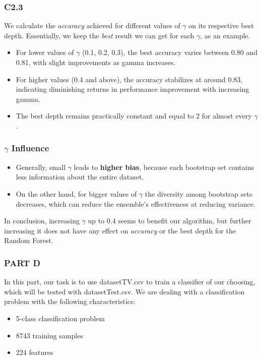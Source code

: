 \documentclass{beamer}
\begin{document}
\begin{frame}
\frametitle{C2.3}

We calculate the \textit{accuracy} achieved for different values of $\gamma$ on its respective best depth. Essentially, we keep the \textit{best} result we can get for each $\gamma$, as an example. 

\begin{itemize}
    \item For lower values of $\gamma$ (0.1, 0.2, 0.3), the best accuracy varies between 0.80 and 0.81, with slight improvements as gamma increases. 
    \item For higher values (0.4 and above), the accuracy stabilizes at around 0.83, indicating diminishing returns in performance improvement with increasing gamma. 
    \item The best depth remains practically constant and equal to 2 for almost every $\gamma$.
\end{itemize}

\end{frame}

\begin{frame}
\frametitle{$\gamma$ Influence}
\begin{itemize}
    \item Generally, small $\gamma$ leads to \textbf{higher bias}, because each bootstrap set contains less information about the entire dataset.
    \item On the other hand, for bigger values of $\gamma$ the diversity among bootstrap sets decreases, which can reduce the ensemble's effectiveness at reducing variance.
\end{itemize}
\vspace{0.5cm}
In conclusion, increasing $\gamma$ up to 0.4 seems to benefit our algorithm, but further increasing it does not have any effect on \textit{accuracy} or the best depth for the Random Forest.
\end{frame}


\begin{frame}
\frametitle{PART D}
In this part, our task is to use datasetTV.csv to train a classifier of our choosing, which will be tested with datasetTest.csv. We are dealing with a classification problem with the following characteristics:
\begin{itemize}
    \item 5-class classification problem
    \item 8743 training samples
    \item 224 features
\end{itemize}
\end{frame}
\end{document}
